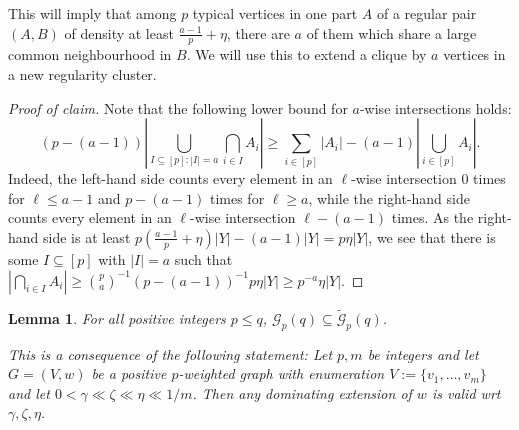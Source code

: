 \documentclass[11pt, a4paper]{article}
\newenvironment{poc}{\begin{proof}[Proof of claim]\renewcommand*{\qedsymbol}{$\blacksquare$}}{\end{proof}}
\newtheorem{lemma}[theorem]{Lemma}
\theoremstyle{definition}
\newcommand{\cG}{\mathcal{G}}
\begin{document}
This will imply that among $p$ typical vertices in one part $A$ of a regular pair $(A,B)$ of density at least $\frac{a-1}{p}+\eta$, there are $a$ of them which share a large common neighbourhood in $B$.
We will use this to extend a clique by $a$ vertices in a new regularity cluster.


\begin{poc}
	Note that the following lower bound for $a$-wise intersections holds:
	$$
	\textstyle{(p-(a-1))\left|\bigcup_{I \subseteq [p]:|I|=a}\bigcap_{i \in I}A_i\right| \geq \sum_{i \in [p]}|A_i|-(a-1)|\bigcup_{i \in [p]}A_i|}.
	$$
	Indeed, the left-hand side counts every element in an $\ell$-wise intersection $0$ times for $\ell\leq a-1$ and $p-(a-1)$ times for $\ell \geq a$, while the right-hand side counts every element in an $\ell$-wise intersection $\ell-(a-1)$ times.
	As the right-hand side is at least $p(\frac{a-1}{p}+\eta)|Y|-(a-1)|Y|=p\eta|Y|$, we see that there is some $I \subseteq [p]$ with $|I|=a$ such that $|\bigcap_{i \in I}A_i| \geq \binom{p}{a}^{-1}(p-(a-1))^{-1}p\eta|Y| \geq p^{-a}\eta|Y|$.
\end{poc}



\begin{lemma}\label{embedding}
	For all positive integers $p \leq q$, $\mathcal{G}_p(q) \subseteq \widetilde{\mathcal{G}}_p(q)$.
	
	\medskip
	This is a consequence of the following statement:
	Let $p,m$ be integers and let $G=(V,w)$ be a positive $p$-weighted graph with enumeration $V := \lbrace v_1,\ldots,v_m\rbrace$
	and let $0 < \gamma \ll \zeta \ll \eta \ll 1/m$. 
	Then any dominating extension of $w$ is valid wrt $\gamma,\zeta,\eta$. %
\end{lemma}
\end{document}
